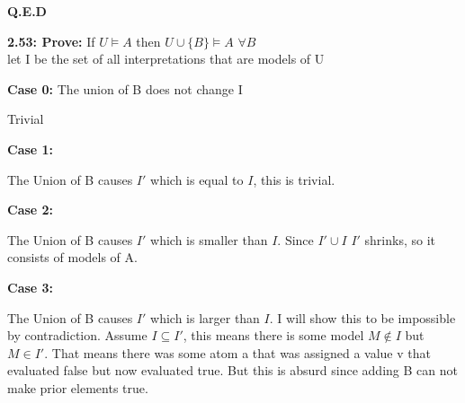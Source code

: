 \documentclass[letterpaper]{article}
\begin{document}
\textbf{Q.E.D}
\pagebreak

\textbf{2.53: Prove:}
If $U \vDash A$ then $U \cup \{B\} \vDash A $ $\forall B $
\\[1ex]

let I be the set of all interpretations that are models of U

\textbf{Case 0:}
The union of B does not change I

Trivial

\textbf{Case 1:}

The Union of B causes $I'$ which is equal to $I$, this is trivial.

\textbf{Case 2:}

The Union of B causes $I'$ which is smaller than $I$.  Since $I' \cup I$ $I'$
shrinks, so it consists of models of A.

\textbf{Case 3:}

The Union of B causes $I'$ which is larger than $I$.  I will show this to be 
impossible by contradiction.  Assume $I \subseteq I'$, this means there is
some model $ M \notin I $ but $M \in I'$.  That means there was some atom a
that was assigned a value v that evaluated false but now evaluated true. But this is absurd since adding B can not make prior elements true.
\end{document}

